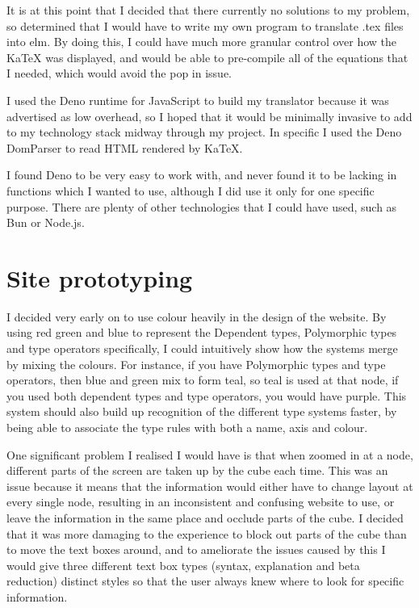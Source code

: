 \documentclass{l4proj}
\begin{document}
It is at this point that I decided that there currently no solutions to my problem, so determined that I would have to write my own program to translate .tex files into elm.  By doing this, I could have much more granular control over how the KaTeX was displayed, and would be able to pre-compile all of the equations that I needed, which would avoid the pop in issue.

I used the Deno runtime for JavaScript to build my translator because it was advertised as low overhead, so I hoped that it would be minimally invasive to add to my technology stack midway through my project.  In specific I used the Deno DomParser to read HTML rendered by KaTeX. 

I found Deno to be very easy to work with, and never found it to be lacking in functions which I wanted to use, although I did use it only for one specific purpose.  There are plenty of other technologies that I could have used, such as Bun or Node.js.

\section{Site prototyping}

I decided very early on to use colour heavily in the design of the website.  By using red green and blue to represent the Dependent types, Polymorphic types and type operators specifically, I could intuitively show how the systems merge by mixing the colours.  For instance, if you have Polymorphic types and type operators, then blue and green mix to form teal, so teal is used at that node, if you used both dependent types and type operators, you would have purple.  This system should also build up recognition of the different type systems faster, by being able to associate the type rules with both a name, axis and colour.

One significant problem I realised I would have is that when zoomed in at a node, different parts of the screen are taken up by the cube each time.  This was an issue because it means that the information would either have to change layout at every single node, resulting in an inconsistent and confusing website to use, or leave the information in the same place and occlude parts of the cube.  I decided that it was more damaging to the experience to block out parts of the cube than to move the text boxes around, and to ameliorate the issues caused by this I would give three different text box types (syntax, explanation and beta reduction) distinct styles so that the user always knew where to look for specific information.
\end{document}
